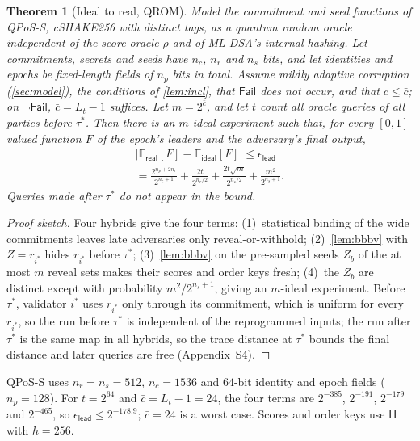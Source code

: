 \documentclass[10pt,journal,compsoc]{IEEEtran}
\theoremstyle{tplain}
\newtheorem{theorem}{Theorem}
\theoremstyle{tdef}
\theoremstyle{remark}
\newcommand{\supp}[1]{Appendix~#1}
\newcommand{\Hash}{\mathsf{H}}
\newcommand{\RO}{\rho}
\begin{document}
\begin{theorem}[Ideal to real, QROM]\label{thm:fresh}
Model the commitment and seed functions of QPoS-S, cSHAKE256 with distinct tags, as a quantum random oracle independent of the score oracle $\RO$ and of ML-DSA's internal hashing. Let commitments, secrets and seeds have $n_c$, $n_r$ and $n_s$ bits, and let identities and epochs be fixed-length fields of $n_p$ bits in total. Assume mildly adaptive corruption (\cref{sec:model}), the conditions of \cref{lem:incl}, that $\mathsf{Fail}$ does not occur, and that $c\le\bar c$; on $\neg\mathsf{Fail}$, $\bar c=L_t-1$ suffices. Let $m=2^{\bar c}$, and let $t$ count all oracle queries of all parties before $\tau^\ast$. Then there is an $m$-ideal experiment such that, for every $[0,1]$-valued function $F$ of the epoch's leaders and the adversary's final output,
\begin{multline*}
\big|\mathbb E_{\mathsf{real}}[F]-\mathbb E_{\mathsf{ideal}}[F]\big|\le\epsilon_{\mathsf{lead}}\\=\frac{2^{n_p+2n_r}}{2^{n_c+1}}+\frac{2t}{2^{n_r/2}}+\frac{2t\sqrt m}{2^{n_s/2}}+\frac{m^2}{2^{n_s+1}}.
\end{multline*}
Queries made after $\tau^\ast$ do not appear in the bound.
\end{theorem}
\begin{proof}[Proof sketch]
Four hybrids give the four terms: (1)~statistical binding of the wide commitments leaves late adversaries only reveal-or-withhold; (2)~\cref{lem:bbbv} with $Z=r_{i^\ast}$ hides $r_{i^\ast}$ before $\tau^\ast$; (3)~\cref{lem:bbbv} on the pre-sampled seeds $Z_b$ of the at most $m$ reveal sets makes their scores and order keys fresh; (4)~the $Z_b$ are distinct except with probability $m^2/2^{n_s+1}$, giving an $m$-ideal experiment. Before $\tau^\ast$, validator $i^\ast$ uses $r_{i^\ast}$ only through its commitment, which is uniform for every $r_{i^\ast}$, so the run before $\tau^\ast$ is independent of the reprogrammed inputs; the run after $\tau^\ast$ is the same map in all hybrids, so the trace distance at $\tau^\ast$ bounds the final distance and later queries are free (\supp{S4}).
\end{proof}

\noindent QPoS-S uses $n_r=n_s=512$, $n_c=1536$ and $64$-bit identity and epoch fields ($n_p=128$). For $t=2^{64}$ and $\bar c=L_t-1=24$, the four terms are $2^{-385}$, $2^{-191}$, $2^{-179}$ and $2^{-465}$, so $\epsilon_{\mathsf{lead}}\le 2^{-178.9}$; $\bar c=24$ is a worst case. Scores and order keys use $\Hash$ with $h=256$.
\end{document}
